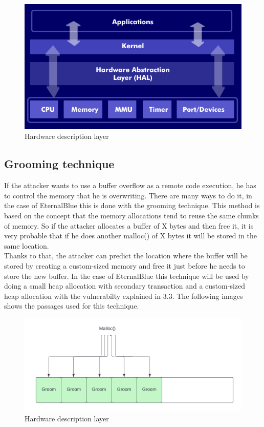 \begin{figure}[ht!]
    \centering
      \includegraphics[scale=0.5]{images/hal.png}
      \caption{Hardware description layer}
\end{figure}

\clearpage

\subsection{Grooming technique}
If the attacker wants to use a buffer overflow as a remote code execution, he has to control the memory that he is overwriting. There are many ways to do it, in 
the case of EternalBlue this is done with the grooming technique. This method is based on the concept that the memory allocations tend to reuse the same chunks of memory. So if the 
attacker allocates a buffer of X bytes and then free it, it is very probable that if he does another malloc() of X bytes it will be stored in the same location.\\
Thanks to that, the attacker can predict the location where the buffer will be stored by creating a custom-sized memory and free it just before he needs to store the new buffer. In the case of 
EternalBlue this technique will be used by doing a small heap allocation with secondary transaction and a custom-sized heap allocation with the vulnerabilty explained in 3.3.
The following images shows the passages used for this technique.

\begin{figure}[ht!]
    \centering
      \includegraphics[scale=0.5]{images/grooming_malloc.png}
      \caption{Hardware description layer}
\end{figure}

